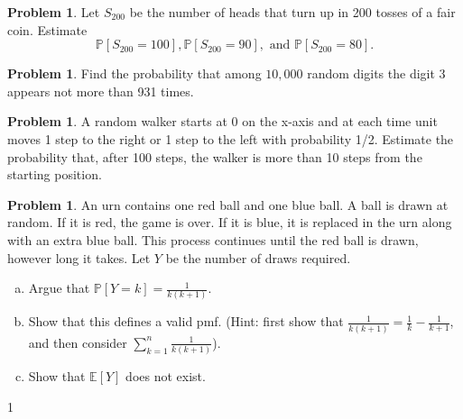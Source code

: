 \documentclass[10pt]{article}
\theoremstyle{definition}
\newtheorem{problem}[theorem]{Problem}
\newcommand{\1}[1]{\textbf{1}_{\left[#1\right]}} %
\def\E{\mathbb{E}} %
\def\P{\mathbb{P}} %
\begin{document}


\begin{problem}
  Let $S_{200}$ be the number of heads that turn up in 200 tosses of a fair
  coin. Estimate
  \begin{equation*}
    \P\left[S_{200}=100 \right], \P\left[S_{200}=90 \right], \text{ and } \P\left[S_{200}=80 \right].
  \end{equation*}
\end{problem}



\begin{problem}
  Find the probability that among $10,000$ random digits the digit 3 appears
  not more than 931 times.
\end{problem}


\begin{problem}
  A random walker starts at 0 on the x-axis and at each time unit moves 1 step
  to the right or 1 step to the left with probability 1/2. Estimate the
  probability that, after 100 steps, the walker is more than 10 steps from the
  starting position.
\end{problem}



\begin{problem}
  An urn contains one red ball and one blue ball. A ball is drawn at random.
  If it is red, the game is over. If it is blue, it is replaced in the urn
  along with an extra blue ball. This process continues until the red ball is
  drawn, however long it takes. Let $Y$ be the number of draws required.
  \begin{enumerate}[(a)]
    \item Argue that $\P\left[Y=k \right] = \frac{1}{k(k+1)}$.
    \item Show that this defines a valid pmf. (Hint: first show that
    $\frac{1}{k(k+1)}= \frac{1}{k}-\frac{1}{k+1}$, and then consider
    $\sum_{k=1}^{n}\frac{1}{k(k+1)}$).
    \item Show that $\E\left[Y \right]$ does not exist.
  \end{enumerate}1
\end{problem}
\end{document}

